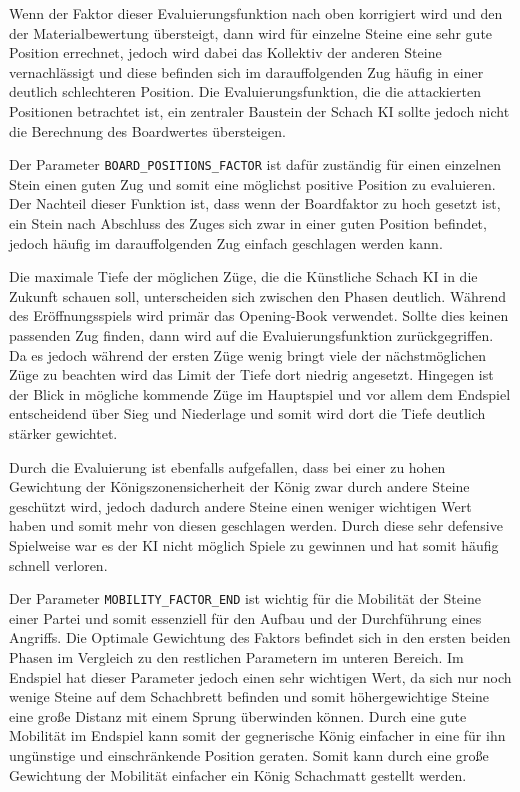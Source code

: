 Wenn der Faktor dieser Evaluierungsfunktion nach oben korrigiert wird und den der Materialbewertung übersteigt, dann wird für einzelne Steine eine sehr gute Position errechnet, jedoch wird dabei das Kollektiv der anderen Steine vernachlässigt und diese befinden sich im darauffolgenden Zug häufig in einer deutlich schlechteren Position. Die Evaluierungsfunktion, die die attackierten Positionen betrachtet ist, ein zentraler Baustein der Schach KI sollte jedoch nicht die Berechnung des Boardwertes übersteigen.

Der Parameter \texttt{BOARD\_POSITIONS\_FACTOR} ist dafür zuständig für einen einzelnen Stein einen guten Zug und somit eine möglichst positive Position zu evaluieren. Der Nachteil dieser Funktion ist, dass wenn der Boardfaktor zu hoch gesetzt ist, ein Stein nach Abschluss des Zuges sich zwar in einer guten Position befindet, jedoch häufig im darauffolgenden Zug einfach geschlagen werden kann.

Die maximale Tiefe der möglichen Züge, die die Künstliche Schach KI in die Zukunft schauen soll, unterscheiden sich zwischen den Phasen deutlich. Während des Eröffnungsspiels wird primär das Opening-Book verwendet. Sollte dies keinen passenden Zug finden, dann wird auf die Evaluierungsfunktion zurückgegriffen. Da es jedoch während der ersten Züge wenig bringt viele der nächstmöglichen Züge zu beachten wird das Limit der Tiefe dort niedrig angesetzt. Hingegen ist der Blick in mögliche kommende Züge im Hauptspiel und vor allem dem Endspiel entscheidend über Sieg und Niederlage und somit wird dort die Tiefe deutlich stärker gewichtet.

Durch die Evaluierung ist ebenfalls aufgefallen, dass bei einer zu hohen Gewichtung der Königszonensicherheit der König zwar durch andere Steine geschützt wird, jedoch dadurch andere Steine einen weniger wichtigen Wert haben und somit mehr von diesen geschlagen werden. Durch diese sehr defensive Spielweise war es der KI nicht möglich Spiele zu gewinnen und hat somit häufig schnell verloren.

Der Parameter \texttt{MOBILITY\_FACTOR\_END} ist wichtig für die Mobilität der Steine einer Partei und somit essenziell für den Aufbau und der Durchführung eines Angriffs. Die Optimale Gewichtung des Faktors befindet sich in den ersten beiden Phasen im Vergleich zu den restlichen Parametern im unteren Bereich. Im Endspiel hat dieser Parameter jedoch einen sehr wichtigen Wert, da sich nur noch wenige Steine auf dem Schachbrett befinden und somit höhergewichtige Steine eine große Distanz mit einem Sprung überwinden können. Durch eine gute Mobilität im Endspiel kann somit der gegnerische König einfacher in eine für ihn ungünstige und einschränkende Position geraten. Somit kann durch eine große Gewichtung der Mobilität einfacher ein König Schachmatt gestellt werden.

